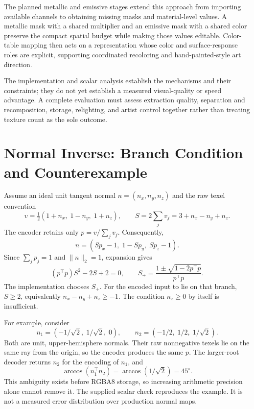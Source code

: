 \documentclass[11pt,letterpaper]{article}
\begin{document}
The planned metallic and emissive stages extend this approach from importing available channels to obtaining missing masks and material-level values. A metallic mask with a shared multiplier and an emissive mask with a shared color preserve the compact spatial budget while making those values editable. Color-table mapping then acts on a representation whose color and surface-response roles are explicit, supporting coordinated recoloring and hand-painted-style art direction.

The implementation and scalar analysis establish the mechanisms and their constraints; they do not yet establish a measured visual-quality or speed advantage. A complete evaluation must assess extraction quality, separation and recomposition, storage, relighting, and artist control together rather than treating texture count as the sole outcome.

\FloatBarrier

\appendix
\section{Normal Inverse: Branch Condition and Counterexample}
\label{app:normal}
Assume an ideal unit tangent normal $n=(n_x,n_y,n_z)$ and the raw texel convention
\begin{equation}
v=\tfrac12(1+n_x,\;1-n_y,\;1+n_z),
\qquad S=2\sum_j v_j=3+n_x-n_y+n_z.
\end{equation}
The encoder retains only $p=v/\sum_jv_j$. Consequently,
\begin{equation}
n=(Sp_x-1,\;1-Sp_y,\;Sp_z-1).
\end{equation}
Since $\sum_jp_j=1$ and $\|n\|_2=1$, expansion gives
\begin{equation}
(p^\top p)S^2-2S+2=0,
\qquad S_\pm=\frac{1\pm\sqrt{1-2p^\top p}}{p^\top p}.
\label{eq:roots}
\end{equation}
The implementation chooses $S_+$. For the encoded input to lie on that branch, $S\ge2$, equivalently $n_x-n_y+n_z\ge-1$. The condition $n_z\ge0$ by itself is insufficient.

For example, consider
\begin{equation}
n_1=(-1/\sqrt2,\;1/\sqrt2,\;0),
\qquad n_2=(-1/2,\;1/2,\;1/\sqrt2).
\end{equation}
Both are unit, upper-hemisphere normals. Their raw nonnegative texels lie on the same ray from the origin, so the encoder produces the same $p$. The larger-root decoder returns $n_2$ for the encoding of $n_1$, and
\begin{equation}
\arccos(n_1^\top n_2)=\arccos(1/\sqrt2)=45^\circ.
\end{equation}
This ambiguity exists before RGBA8 storage, so increasing arithmetic precision alone cannot remove it. The supplied scalar check reproduces the example. It is not a measured error distribution over production normal maps.
\end{document}
